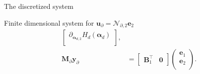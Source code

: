\documentclass[aspectratio=169]{ISAE-Beamer}
\begin{document}
\begin{frame}{The discretized system}
{\begin{exampleblock}{Finite dimensional system for $\bm{u}_\partial = \mathcal{N}_{\partial, 2} \displaystyle \bm{e}_2$}
\begin{equation*}
\begin{aligned}
\begin{bmatrix}
		\partial_{\bm{\alpha}_{d, 2}} H_d(\bm{\alpha}_d)\\
		\end{bmatrix}, \\
		\mathbf{M}_\partial {\mathbf{y}_\partial} &= \begin{bmatrix}
		\mathbf{B}_1^\top & \mathbf{0}
		\end{bmatrix}\begin{pmatrix}
		\mathbf{e}_{1} \\
		\mathbf{e}_{2} \\
		\end{pmatrix}.
		\end{aligned}
		\end{equation*}
	\end{exampleblock}
}

\end{frame}
\end{document}

